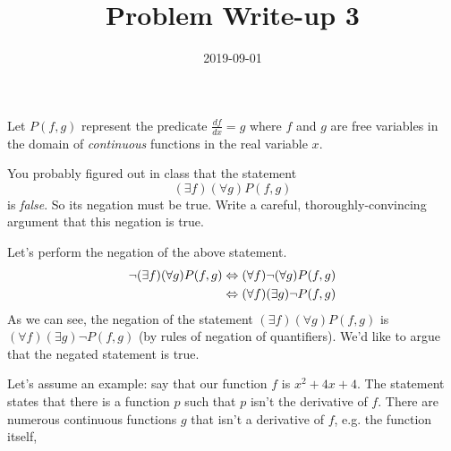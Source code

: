 \documentclass[a4paper,12pt]{article}
\title{Problem Write-up 3}
\date{2019-09-01}
\begin{document}
    \begin{problem}
        Let \(P(f,g)\) represent the predicate \(\frac{df}{dx} = g\) where \(f\) and \(g\) are free variables in the domain of \textit{continuous} functions in the real variable \(x\).

        You probably figured out in class that the statement \[(\exists f)(\forall g) P(f,g)\] is \textit{false}. So its negation must be true. Write a careful, thoroughly-convincing argument that this negation is true.

    \end{problem}
    \begin{answer}
        Let's perform the negation of the above statement.
        \begin{align*}
            \neg (\exists f)(\forall g) P(f,g) &\Leftrightarrow (\forall f) \neg (\forall g) P(f,g) \\
            &\Leftrightarrow (\forall f) (\exists g) \neg P(f,g)
        \end{align*}
        As we can see, the negation of the statement \((\exists f)(\forall g) P(f,g)\) is \((\forall f) (\exists g) \neg P(f,g)\) (by rules of negation of quantifiers). We'd like to argue that the negated statement is true.

        Let's assume an example: say that our function \(f\) is \(x^2 + 4x + 4\). The statement states that there is a function \(p\) such that \(p\) isn't the derivative of \(f\). There are numerous continuous functions \(g\) that isn't a derivative of \(f\), e.g. the function itself, 
    \end{answer}
\end{document}
